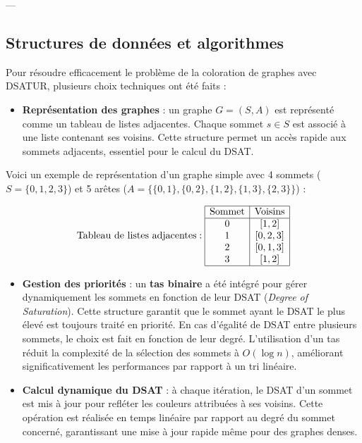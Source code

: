 \documentclass[11pt]{article}
\begin{document}
---

\subsection{Structures de données et algorithmes}

Pour résoudre efficacement le problème de la coloration de graphes avec DSATUR, plusieurs choix techniques ont été faits :
\begin{itemize}
    \item \textbf{Représentation des graphes} : un graphe \( G = (S, A) \) est représenté comme un tableau de listes adjacentes. Chaque sommet \( s \in S \) est associé à une liste contenant ses voisins. Cette structure permet un accès rapide aux sommets adjacents, essentiel pour le calcul du DSAT.
\end{itemize}

\noindent Voici un exemple de représentation d’un graphe simple avec 4 sommets (\( S = \{0, 1, 2, 3\} \)) et 5 arêtes (\( A = \{ \{0, 1\}, \{0, 2\}, \{1, 2\}, \{1, 3\}, \{2, 3\} \} \)) :
\begin{center}
\end{center}
\[
\text{Tableau de listes adjacentes} :  
\begin{array}{|c|c|}
\hline
\text{Sommet} & \text{Voisins} \\
\hline
0 & [1, 2] \\
1 & [0, 2, 3] \\
2 & [0, 1, 3] \\
3 & [1, 2] \\
\hline
\end{array}
\]

\begin{itemize}
    \item \textbf{Gestion des priorités} : un \textbf{tas binaire} a été intégré pour gérer dynamiquement les sommets en fonction de leur DSAT (\textit{Degree of Saturation}). Cette structure garantit que le sommet ayant le DSAT le plus élevé est toujours traité en priorité. En cas d'égalité de DSAT entre plusieurs sommets, le choix est fait en fonction de leur degré. L’utilisation d’un tas réduit la complexité de la sélection des sommets à \( O(\log n) \), améliorant significativement les performances par rapport à un tri linéaire.
    \item \textbf{Calcul dynamique du DSAT} : à chaque itération, le DSAT d’un sommet est mis à jour pour refléter les couleurs attribuées à ses voisins. Cette opération est réalisée en temps linéaire par rapport au degré du sommet concerné, garantissant une mise à jour rapide même pour des graphes denses.
\end{itemize}
\end{document}
